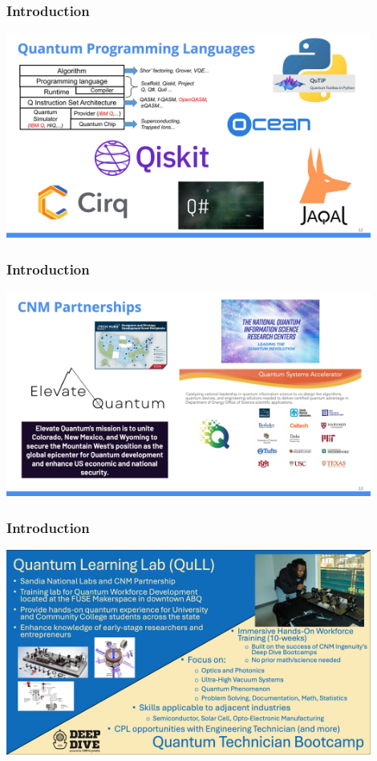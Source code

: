\documentclass{beamer}
\begin{document}
\begin{frame}\frametitle{Introduction}
\begin{center}
\includegraphics[width=12cm]{fig/Slide12.jpeg}
\end{center}
\end{frame}

\begin{frame}\frametitle{Introduction}
\begin{center}
\includegraphics[width=12cm]{fig/Slide13.jpeg}
\end{center}
\end{frame}

\begin{frame}\frametitle{Introduction}
\begin{center}
\includegraphics[width=12cm]{fig/Slide14.jpeg}
\end{center}
\end{frame}
\end{document}
